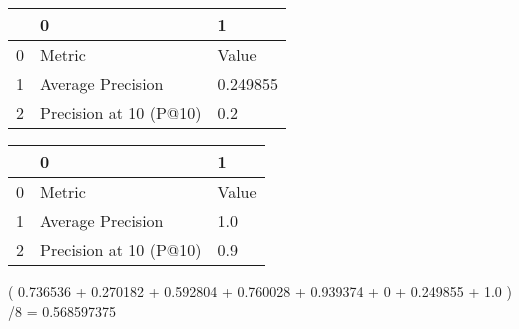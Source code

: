 \begin{tabular}{lll}
\toprule
{} &                       0 &         1 \\
\midrule
0 &                  Metric &     Value \\
1 &       Average Precision &  0.249855 \\
2 &  Precision at 10 (P@10) &       0.2 \\
\bottomrule
\end{tabular}

\begin{tabular}{lll}
\toprule
{} &                       0 &      1 \\
\midrule
0 &                  Metric &  Value \\
1 &       Average Precision &    1.0 \\
2 &  Precision at 10 (P@10) &    0.9 \\
\bottomrule
\end{tabular}

(  0.736536 +
0.270182 +
0.592804 +
0.760028 +
0.939374 +
    0 +
0.249855 +
  1.0 ) /8 = 0.568597375
